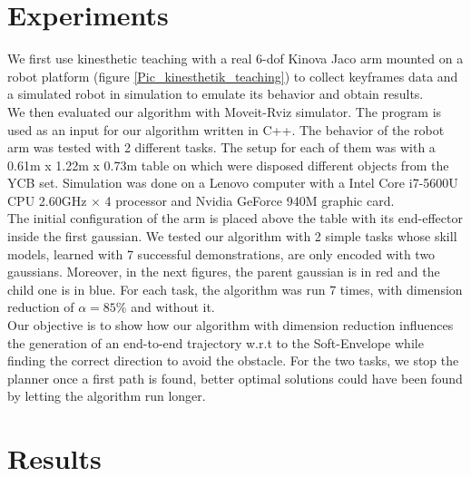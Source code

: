 \documentclass[letterpaper, 10 pt, conference]{ieeeconf}  %
\begin{document}
\section{Experiments}
We first use kinesthetic teaching with a real 6-dof Kinova Jaco arm mounted on a robot platform (figure \ref{Pic_kinesthetik_teaching}) to collect keyframes data and a simulated robot in simulation to emulate its behavior and obtain results.\\
We then evaluated our algorithm with Moveit-Rviz simulator. The program is used as an input for our algorithm written in C++. The behavior of the robot arm was tested with 2 different tasks. The setup for each of them was with a 0.61m x 1.22m x 0.73m table on which were disposed different objects from the YCB set. Simulation was done on a Lenovo computer with  a Intel Core i7-5600U CPU 2.60GHz × 4 processor and Nvidia GeForce 940M graphic card.\\
 The initial configuration of the arm is placed above the table with its end-effector inside the first gaussian. We tested our algorithm with 2 simple tasks whose skill models, learned with 7 successful demonstrations, are only encoded with two gaussians.  Moreover, in the next figures, the parent gaussian is in red and the child one is in blue. For each task, the algorithm was run 7 times, with dimension reduction of $\alpha = 85 \%$ and without it.\\
  Our objective is to show how our algorithm with dimension reduction influences the generation of an end-to-end trajectory w.r.t to the Soft-Envelope while finding the correct direction to avoid the obstacle. For the two tasks, we stop the planner once a first path is found, better optimal solutions could have been found by letting the algorithm run longer.

\section{Results}
\end{document}
